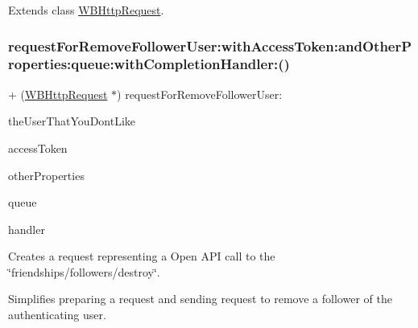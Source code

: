 Extends class \mbox{\hyperlink{interface_w_b_http_request_abb1e37b606f28ab890279b1ce62de963}{W\+B\+Http\+Request}}.

\mbox{\label{category_w_b_http_request_07_weibo_user_08_abb1e37b606f28ab890279b1ce62de963}} 
\subsubsection{\texorpdfstring{request\+For\+Remove\+Follower\+User\+:with\+Access\+Token\+:and\+Other\+Properties\+:queue\+:with\+Completion\+Handler\+:()}{requestForRemoveFollowerUser:withAccessToken:andOtherProperties:queue:withCompletionHandler:()}\hspace{0.1cm}{\footnotesize\ttfamily [2/3]}}
{\footnotesize\ttfamily + (\mbox{\hyperlink{interface_w_b_http_request}{W\+B\+Http\+Request}} $\ast$) request\+For\+Remove\+Follower\+User\+: \begin{DoxyParamCaption}\item[{(N\+S\+String $\ast$)}]{the\+User\+That\+You\+Dont\+Like }\item[{withAccessToken:(N\+S\+String $\ast$)}]{access\+Token }\item[{andOtherProperties:(N\+S\+Dictionary $\ast$)}]{other\+Properties }\item[{queue:(N\+S\+Operation\+Queue $\ast$)}]{queue }\item[{withCompletionHandler:(W\+B\+Request\+Handler)}]{handler }\end{DoxyParamCaption}}

Creates a request representing a Open A\+PI call to the \char`\"{}friendships/followers/destroy\char`\"{}.

Simplifies preparing a request and sending request to remove a follower of the authenticating user.

